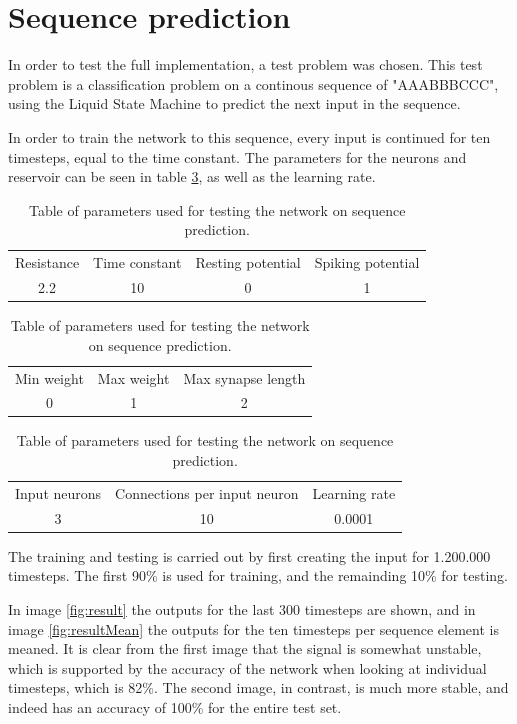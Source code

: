 \section{Sequence prediction}

In order to test the full implementation, a test problem was chosen. This test problem is a classification problem on a continous sequence of "AAABBBCCC", using the Liquid State Machine to predict the next input in the sequence.

In order to train the network to this sequence, every input is continued for ten timesteps, equal to the time constant. The parameters for the neurons and reservoir can be seen in table \ref{tab:final}, as well as the learning rate.

\begin{table}[h]
\centering
\begin{tabular}{cccc}
Resistance & Time constant & Resting potential & Spiking potential\\
2.2 & 10 & 0 & 1
\end{tabular}
\begin{tabular}{ccc}
Min weight & Max weight & Max synapse length\\
0 & 1 & 2
\end{tabular}
\begin{tabular}{ccc}
Input neurons & Connections per input neuron & Learning rate\\
3 & 10 & 0.0001
\end{tabular}
\caption{Table of parameters used for testing the network on sequence prediction.}
\label{tab:final}
\end{table}

The training and testing is carried out by first creating the input for 1.200.000 timesteps. The first 90\% is used for training, and the remainding 10\% for testing.

In image \ref{fig:result} the outputs for the last 300 timesteps are shown, and in image \ref{fig:resultMean} the outputs for the ten timesteps per sequence element is meaned. It is clear from the first image that the signal is somewhat unstable, which is supported by the accuracy of the network when looking at individual timesteps, which is 82\%. The second image, in contrast, is much more stable, and indeed has an accuracy of 100\% for the entire test set.


